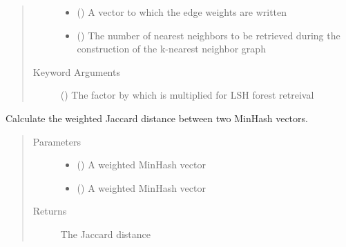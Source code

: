\documentclass[letterpaper,10pt,english]{sphinxmanual}
\begin{document}
\begin{fulllineitems}
\begin{fulllineitems}
\begin{quote}
\begin{description}
\begin{itemize}
\item {} 
 () \textendash{} A vector to which the edge weights are written

\item {} 
 () \textendash{} The number of nearest neighbors to be retrieved during the construction of the k-nearest neighbor graph

\end{itemize}

\item[{Keyword Arguments}] \leavevmode
{} () \textendash{} The factor by which  is multiplied for LSH forest retreival

\end{description}\end{quote}

\end{fulllineitems}


\begin{fulllineitems}
\label{\detokenize{documentation:tmap.LSHForest.get_weighted_distance}}
Calculate the weighted Jaccard distance between two MinHash vectors.
\begin{quote}\begin{description}
\item[{Parameters}] \leavevmode\begin{itemize}
\item {} 
 () \textendash{} A weighted MinHash vector

\item {} 
 () \textendash{} A weighted MinHash vector

\end{itemize}

\item[{Returns}] \leavevmode
{} The Jaccard distance


\end{description}
\end{quote}
\end{fulllineitems}
\end{fulllineitems}
\end{document}
